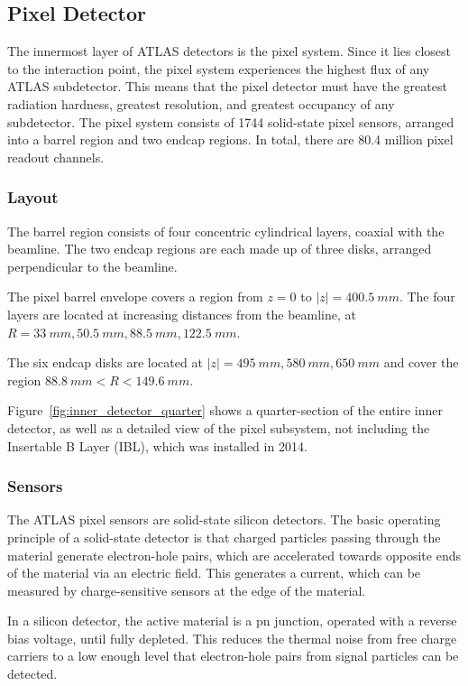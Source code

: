 \subsection{Pixel Detector}\label{subsec:pixel}

The innermost layer of ATLAS detectors is the pixel system.
Since it lies closest to the interaction point, the pixel system experiences the highest flux of any ATLAS subdetector.
This means that the pixel detector must have the greatest radiation hardness, greatest resolution,
and greatest occupancy of any subdetector.\cite{atlas-detector-2008}
The pixel system consists of 1744 solid-state pixel sensors, arranged into a barrel region and two endcap regions.
In total, there are 80.4 million pixel readout channels.\cite{atlas-detector-2008}

\subsubsection{Layout}
The barrel region consists of four concentric cylindrical layers, coaxial with the beamline.
The two endcap regions are each made up of three disks, arranged perpendicular to the beamline.

The pixel barrel envelope covers a region from $z = 0$ to $|z|  = 400.5~mm$.
The four layers are located at increasing distances from the beamline, at $R = 33~mm, 50.5~mm, 88.5~mm, 122.5~mm$.

The six endcap disks are located at $|z| = 495~mm, 580~mm, 650~mm$ and cover the region $88.8~mm < R < 149.6~mm$.\cite{atlas-detector-2008}

Figure~\ref{fig:inner_detector_quarter} shows a quarter-section of
the entire inner detector, as well as a detailed view of the pixel
subsystem, not including the Insertable B Layer (IBL), which was
installed in 2014.

\subsubsection{Sensors}
The ATLAS pixel sensors are solid-state silicon detectors.
The basic operating principle of a solid-state detector is that charged particles passing through the material
generate electron-hole pairs, which are accelerated towards opposite ends of the material via an electric field.
This generates a current, which can be measured by charge-sensitive sensors at the edge of the material.\cite{spieler-2005}

In a silicon detector, the active material is a pn junction, operated with a reverse bias voltage,
until fully depleted.
This reduces the thermal noise from free charge carriers to a low enough level that electron-hole pairs
from signal particles can be detected.\cite{spieler-2005}


